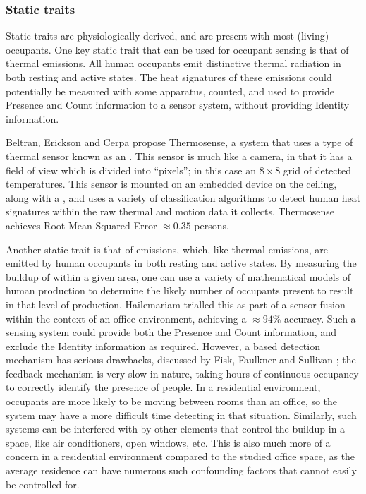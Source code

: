 \documentclass[../thesis/thesis.tex]{subfiles}
\begin{document}
\subsubsection{Static traits}
\label{subsubsec:litreview:sensors:intrinsic:static}
Static traits are physiologically derived, and are present with most (living) occupants. One key static trait that can be used for occupant sensing is that of thermal emissions. All human occupants emit distinctive thermal radiation in both resting and active states. The heat signatures of these emissions could potentially be measured with some apparatus, counted, and used to provide Presence and Count information to a sensor system, without providing Identity information.

Beltran, Erickson and Cerpa \cite{beltran2013thermosense} propose Thermosense, a system that uses a type of thermal sensor known as an \iar. This sensor is much like a camera, in that it has a field of view which is divided into ``pixels''; in this case an $8\times8$ grid of detected temperatures. This sensor is mounted on an embedded device on the ceiling, along with a \pir, and uses a variety of classification algorithms to detect human heat signatures within the raw thermal and motion data it collects. Thermosense achieves Root Mean Squared Error $\approx0.35$ persons.

Another static trait is that of \cdi emissions, which, like thermal emissions, are emitted by human occupants in both resting and active states. By measuring the buildup of \cdi within a given area, one can use a variety of mathematical models of human \cdi production to determine the likely number of occupants present to result in that level of \cdi production. Hailemariam \etal \cite{hailemariam2011real} trialled this as part of a sensor fusion within the context of an office environment, achieving a $\approx94\%$ accuracy. Such a sensing system could provide both the Presence and Count information, and exclude the Identity information as required. However, a \cdi based detection mechanism has serious drawbacks, discussed by Fisk, Faulkner and Sullivan \cite{fisk2006accuracy}; the \cdi feedback mechanism is very slow in nature, taking hours of continuous occupancy to correctly identify the presence of people. In a residential environment, occupants are more likely to be moving between rooms than an office, so the system may have a more difficult time detecting in that situation. Similarly, such systems can be interfered with by other elements that control the \cdi buildup in a space, like air conditioners, open windows, etc. This is also much more of a concern in a residential environment compared to the studied office space, as the average residence can have numerous such confounding factors that cannot easily be controlled for.
\end{document}
